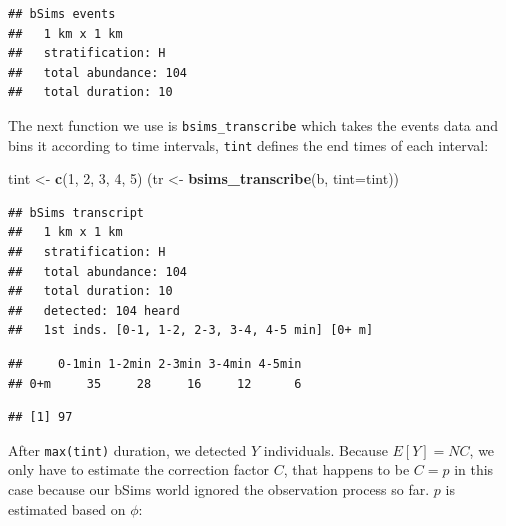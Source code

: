 \documentclass[12pt,]{book}
\newenvironment{Shaded}{\begin{snugshade}}{\end{snugshade}}
\newcommand{\CommentTok}[1]{\textcolor[rgb]{0.56,0.35,0.01}{\textit{#1}}}
\newcommand{\DataTypeTok}[1]{\textcolor[rgb]{0.13,0.29,0.53}{#1}}
\newcommand{\DecValTok}[1]{\textcolor[rgb]{0.00,0.00,0.81}{#1}}
\newcommand{\KeywordTok}[1]{\textcolor[rgb]{0.13,0.29,0.53}{\textbf{#1}}}
\newcommand{\NormalTok}[1]{#1}
\newcommand{\OperatorTok}[1]{\textcolor[rgb]{0.81,0.36,0.00}{\textbf{#1}}}
\newcommand{\StringTok}[1]{\textcolor[rgb]{0.31,0.60,0.02}{#1}}
\begin{document}
\begin{verbatim}
## bSims events
##   1 km x 1 km
##   stratification: H
##   total abundance: 104
##   total duration: 10
\end{verbatim}

The next function we use is \texttt{bsims\_transcribe} which takes the events data
and bins it according to time intervals, \texttt{tint} defines the end times of
each interval:

\begin{Shaded}
\begin{Highlighting}[]
\NormalTok{tint <-}\StringTok{ }\KeywordTok{c}\NormalTok{(}\DecValTok{1}\NormalTok{, }\DecValTok{2}\NormalTok{, }\DecValTok{3}\NormalTok{, }\DecValTok{4}\NormalTok{, }\DecValTok{5}\NormalTok{)}
\NormalTok{(tr <-}\StringTok{ }\KeywordTok{bsims_transcribe}\NormalTok{(b, }\DataTypeTok{tint=}\NormalTok{tint))}
\end{Highlighting}
\end{Shaded}

\begin{verbatim}
## bSims transcript
##   1 km x 1 km
##   stratification: H
##   total abundance: 104
##   total duration: 10
##   detected: 104 heard
##   1st inds. [0-1, 1-2, 2-3, 3-4, 4-5 min] [0+ m]
\end{verbatim}

\begin{Shaded}
\end{Shaded}

\begin{verbatim}
##     0-1min 1-2min 2-3min 3-4min 4-5min
## 0+m     35     28     16     12      6
\end{verbatim}

\begin{Shaded}
\end{Shaded}

\begin{verbatim}
## [1] 97
\end{verbatim}

After \texttt{max(tint)} duration, we detected \(Y\) individuals.
Because \(E[Y] = NC\), we only have to estimate the correction factor \(C\),
that happens to be \(C=p\) in this case because our bSims world
ignored the observation process so far. \(p\) is estimated based on \(\phi\):
\end{document}
